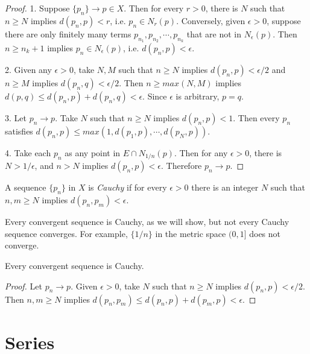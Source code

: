     \begin{proof}
        1. Suppose $\{p_n\} \rightarrow p \in X$. Then for every $r > 0$, there is $N$ such that $n \geq N$ implies $d(p_n, p) < r$, i.e. $p_n \in N_r(p)$. Conversely, given $\epsilon > 0$, suppose there are only finitely many terms $p_{n_1}, p_{n_2}, \cdots, p_{n_k}$ that are not in $N_\epsilon (p)$. Then $n \geq n_k+1$ implies $p_n \in N_\epsilon (p)$, i.e. $d(p_n, p) < \epsilon$.
        
        2. Given any $\epsilon > 0$, take $N, M$ such that $n \geq N$ implies $d(p_n, p) < \epsilon / 2$ and $n \geq M$ implies $d(p_n, q) < \epsilon / 2$. Then $n \geq max(N,M)$ implies $d(p,q) \leq d(p_n,p) + d(p_n,q) < \epsilon$. Since $\epsilon$ is arbitrary, $p=q$.
        
        3. Let $p_n \rightarrow p$. Take $N$ such that $n \geq N$ implies $d(p_n, p) < 1$. Then every $p_n$ satisfies $d(p_n, p) \leq max(1, d(p_1,p), \cdots, d(p_N,p))$.
        
        4. Take each $p_n$ as any point in $E \cap N_{1/n}(p)$. Then for any $\epsilon > 0$, there is $N > 1/\epsilon$, and $n > N$ implies $d(p_n, p) < \epsilon$. Therefore $p_n \rightarrow p$.
    \end{proof}
    
    \begin{defn} \label{def_analysis_cauchy}
        A sequence $\{p_n\}$ in $X$ is \emph{Cauchy} if for every $\epsilon > 0$ there is an integer $N$ such that $n,m \geq N$ implies $d(p_n,p_m) < \epsilon$.
    \end{defn}
    
    Every convergent sequence is Cauchy, as we will show, but not every Cauchy sequence converges. For example, $\{1/n\}$ in the metric space $(0,1]$ does not converge.
    
    \begin{prop} \label{prop_analysis_convcauchy}
        Every convergent sequence is Cauchy.
    \end{prop}
    
    \begin{proof}
        Let $p_n \rightarrow p$. Given $\epsilon > 0$, take $N$ such that $n \geq N$ implies $d(p_n, p) < \epsilon / 2$. Then $n,m \geq N$ implies $d(p_n, p_m) \leq d(p_n,p) + d(p_m,p) < \epsilon$.
    \end{proof}
    
    \section{Series}
    
